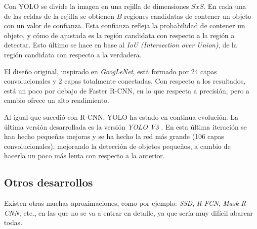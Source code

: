 Con YOLO se divide la imagen en una rejilla de dimensiones $SxS$. En cada una de las celdas de la rejilla se obtienen $B$ regiones candidatas de contener un objeto con un valor de confianza. Esta confianza refleja la probabilidad de contener un objeto, y cómo de ajustada es la región candidata con respecto a la región a detectar. Esto último se hace en base al \textit{IoU (Intersection over Union)}, de la región candidata con respecto a la verdadera.

El diseño original, inspirado en \textit{GoogLeNet}, está formado por 24 capas convolucionales y 2 capas totalmente conectadas. Con respecto a los resultados, está un poco por debajo de Faster R-CNN, en lo que respecta a precisión, pero a cambio ofrece un alto rendimiento.

Al igual que sucedió con R-CNN, YOLO ha estado en continua evolución. La última versión desarrollada es la versión \textit{YOLO V3} \cite{s2_stateofart_yolov3}. En esta última iteración se han hecho pequeñas mejoras y se ha hecho la red más grande (106 capas convolucionales), mejorando la detección de objetos pequeños, a cambio de hacerla un poco más lenta con respecto a la anterior.

\subsection*{Otros desarrollos}

Existen otras muchas aproximaciones, como por ejemplo: \textit{SSD}, \textit{R-FCN}, \textit{Mask R-CNN}, etc., en las que no se va a entrar en detalle, ya que sería muy difícil abarcar todas.